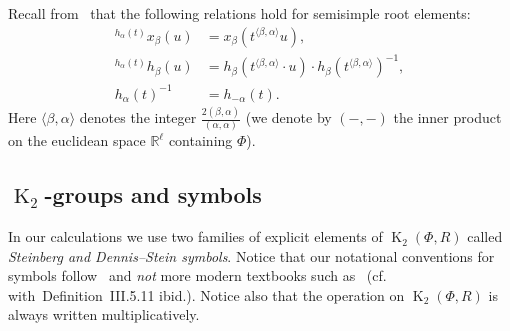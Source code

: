 \documentclass[oneside, 8pt]{amsart}
\theoremstyle{remark}
\theoremstyle{definition}
\numberwithin{lemma}{section}
\numberwithin{prop}{section}
\numberwithin{corollary}{section}
\numberwithin{externaltheorem}{section}
\DeclareMathOperator{\K}{K}
\numberwithin{equation}{section}
\begin{document}
Recall from~\cite[Lemma~5.2]{Ma69} that the following relations hold for semisimple root elements:
\begin{align} \label{eq:conj-h-x} {}^{h_\alpha(t)}\!x_\beta(u) & = x_\beta(t^{\langle \beta,  \alpha \rangle}u), \\
              \label{eq:conj-h-h} {}^{h_\alpha(t)}\!h_\beta(u) & = h_\beta(t^{\langle \beta, \alpha \rangle} \cdot u) \cdot h_\beta(t^{\langle \beta,  \alpha \rangle})^{-1}, \\
              \label{eq:h-inv}    h_\alpha(t)^{-1}             & = h_{-\alpha}(t). \end{align}
Here $\langle \beta, \alpha \rangle$ denotes the integer $\tfrac{2(\beta, \alpha)}{(\alpha, \alpha)}$ (we denote by $(-,-)$ the inner product on the euclidean space $\mathbb{R}^\ell$ containing $\Phi$).

\subsection{\texorpdfstring{$\K_2$}{K2}-groups and symbols} In our calculations we use two families of explicit elements of $\K_2(\Phi, R)$ called {\it Steinberg and Dennis--Stein symbols}. Notice that our notational conventions for symbols follow~\cite{DS73} and {\it not} more modern textbooks such as~\cite{Kbook} (cf. with~Definition~III.5.11 ibid.). Notice also that the operation on $\K_2(\Phi, R)$ is always written multiplicatively.
\end{document}
